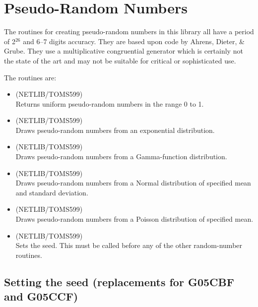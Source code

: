 \documentclass[11pt,twoside,nolof]{starlink}
\begin{document}
\section{Pseudo-Random Numbers}

   The routines for creating pseudo-random numbers in this library all
   have a period of 2$^{26}$ and 6--7 digits accuracy.  They are based
   upon code by Ahrens, Dieter, \& Grube.  They use a multiplicative
   congruential generator which is certainly not the state of the art
   and may not be suitable for critical or sophisticated use.

The routines are:

\begin{itemize}

\item {} (NETLIB/TOMS599)\ \\
   Returns uniform pseudo-random numbers in the range 0 to 1.

\item {} (NETLIB/TOMS599)\ \\
   Draws pseudo-random numbers from an exponential distribution.

\item {} (NETLIB/TOMS599)\ \\
   Draws pseudo-random numbers from a Gamma-function distribution.

\item {} (NETLIB/TOMS599)\ \\
   Draws pseudo-random numbers from a Normal distribution of specified
   mean and standard deviation.

\item {} (NETLIB/TOMS599)\ \\
   Draws pseudo-random numbers from a Poisson distribution of
   specified mean.

\item {} (NETLIB/TOMS599)\ \\
   Sets the seed.  This must be called before any of the other
   random-number routines.

\end{itemize}

\subsection{Setting the seed (replacements for G05CBF and G05CCF)}
\label{se:seeding}
\end{document}
